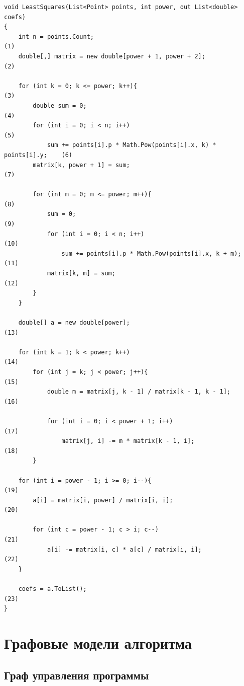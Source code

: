 \documentclass[12pt]{report}
\begin{document}
\begin{lstlisting}[label=some-code,caption=Метод наименьших квадратов]
void LeastSquares(List<Point> points, int power, out List<double> coefs)
{
	int n = points.Count;                                             (1)
	double[,] matrix = new double[power + 1, power + 2];              (2)
	
	for (int k = 0; k <= power; k++){                                 (3)
		double sum = 0;                                                 (4)
		for (int i = 0; i < n; i++)                                     (5)
			sum += points[i].p * Math.Pow(points[i].x, k) * points[i].y;	(6)
		matrix[k, power + 1] = sum;                                     (7)
		
		for (int m = 0; m <= power; m++){                               (8)
			sum = 0;                                                      (9)
			for (int i = 0; i < n; i++)                                   (10)
				sum += points[i].p * Math.Pow(points[i].x, k + m);          (11)
			matrix[k, m] = sum;                                           (12)
		}
	}
	
	double[] a = new double[power];                         			    (13)
	
	for (int k = 1; k < power; k++)                         			    (14)
		for (int j = k; j < power; j++){                         			  (15)
			double m = matrix[j, k - 1] / matrix[k - 1, k - 1];				    (16)
			
			for (int i = 0; i < power + 1; i++)                           (17)
				matrix[j, i] -= m * matrix[k - 1, i];                       (18)
		}
	
	for (int i = power - 1; i >= 0; i--){                             (19)
		a[i] = matrix[i, power] / matrix[i, i];                         (20)
		
		for (int c = power - 1; c > i; c--)                             (21)
			a[i] -= matrix[i, c] * a[c] / matrix[i, i];                   (22)
	}
	
	coefs = a.ToList();                                               (23)
}
\end{lstlisting}

\chapter{Графовые модели алгоритма}

\section{Граф управления программы}
\end{document}
